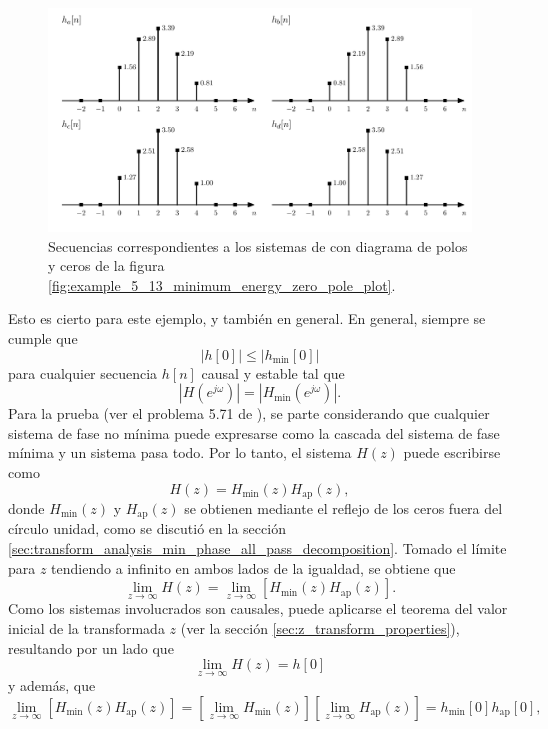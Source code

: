 \documentclass[a4paper]{report}
\begin{document}
\begin{figure}[!htb]
 \begin{center}
 \includegraphics[width=1\textwidth]{figuras/example_5_13_minimum_energy_impulse_responses.pdf}
 \caption{\label{fig:example_5_13_minimum_energy_impulse_responses} Secuencias correspondientes a los sistemas de con diagrama de polos y ceros de la figura \ref{fig:example_5_13_minimum_energy_zero_pole_plot}.}
 \end{center}
\end{figure}
Esto es cierto para este ejemplo, y también en general. En general, siempre se cumple que 
\[
 |h[0]|\leq |h_\textrm{min}[0]|
\]
para cualquier secuencia \(h[n]\) causal y estable tal que 
\[
 |H(e^{j\omega})|=|H_\textrm{min}(e^{j\omega})|.
\]
Para la prueba (ver el problema 5.71 de \cite{oppenheim2009discrete}), se parte considerando que cualquier sistema de fase no mínima puede expresarse como la cascada del sistema de fase mínima y un sistema pasa todo. Por lo tanto, el sistema \(H(z)\) puede escribirse como 
\[
 H(z)=H_\textrm{min}(z)H_\textrm{ap}(z),
\]
donde \(H_\textrm{min}(z)\) y \(H_\textrm{ap}(z)\) se obtienen mediante el reflejo de los ceros fuera del círculo unidad, como se discutió en la sección \ref{sec:transform_analysis_min_phase_all_pass_decomposition}. Tomado el límite para \(z\) tendiendo a infinito en ambos lados de la igualdad, se obtiene que 
\[
 \lim_{z\to\infty}H(z)=\lim_{z\to\infty}\left[H_\textrm{min}(z)H_\textrm{ap}(z)\right].
\]
Como los sistemas involucrados son causales, puede aplicarse el teorema del valor inicial de la transformada \(z\) (ver la sección \ref{sec:z_transform_properties}), resultando por un lado que
\[
 \lim_{z\to\infty}H(z)=h[0]
\]
y además, que 
\[
 \lim_{z\to\infty}\left[H_\textrm{min}(z)H_\textrm{ap}(z)\right]
  =\left[\lim_{z\to\infty}H_\textrm{min}(z)\right]\left[\lim_{z\to\infty}H_\textrm{ap}(z)\right]
  =h_\textrm{min}[0]h_\textrm{ap}[0],
\]
\end{document}
